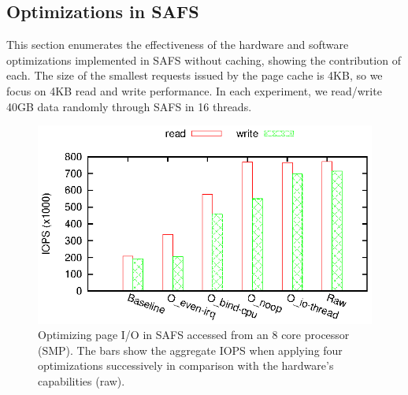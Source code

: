 \subsection{Optimizations in SAFS}
This section enumerates the effectiveness of the hardware and software
optimizations implemented in SAFS without caching,
showing the contribution of each. The size of the smallest
requests issued by the page cache is 4KB, so we focus on 4KB read and write
performance. In each experiment, we read/write 40GB data randomly through
SAFS in 16 threads.

\begin{figure}[tb]
\begin{center}
\includegraphics[scale=1]{figs/SAFS/SSD-improve.eps}
\caption{Optimizing page I/O in SAFS accessed from an 8 core processor (SMP).
The bars show the aggregate IOPS when applying four optimizations successively
in comparison with the hardware's capabilities (raw).}
\label{ssd_impr}
\end{center}
\end{figure}

